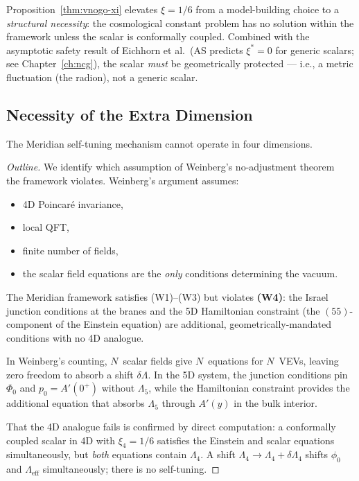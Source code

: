 \begin{remark}
Proposition~\ref{thm:vnogo-xi} elevates $\xi = 1/6$ from a model-building choice to a \emph{structural necessity}: the cosmological constant problem has no solution within the framework unless the scalar is conformally coupled. Combined with the asymptotic safety result of Eichhorn et al.\ (AS predicts $\xi^* = 0$ for generic scalars; see Chapter~\ref{ch:ncg}), the scalar \emph{must} be geometrically protected --- i.e., a metric fluctuation (the radion), not a generic scalar.
\end{remark}

\subsection{Necessity of the Extra Dimension}
\label{sec:3-vnogo-5d}

\begin{proposition}
\label{thm:vnogo-5d}
The Meridian self-tuning mechanism cannot operate in four dimensions.
\end{proposition}

\begin{proof}[Outline]
We identify which assumption of Weinberg's no-adjustment theorem~\cite{ch3:weinberg1989} the framework violates. Weinberg's argument assumes:
\begin{itemize}
  \item[(W1)] 4D Poincar\'e invariance,
  \item[(W2)] local QFT,
  \item[(W3)] finite number of fields,
  \item[(W4)] the scalar field equations are the \emph{only} conditions determining the vacuum.
\end{itemize}

The Meridian framework satisfies (W1)--(W3) but violates \textbf{(W4)}: the Israel junction conditions at the branes and the 5D Hamiltonian constraint (the $(55)$-component of the Einstein equation) are additional, geometrically-mandated conditions with no 4D analogue.

In Weinberg's counting, $N$~scalar fields give $N$~equations for $N$~VEVs, leaving zero freedom to absorb a shift $\delta\Lambda$. In the 5D system, the junction conditions pin $\Phi_0$ and $p_0 = A'(0^+)$ without $\Lambda_5$, while the Hamiltonian constraint provides the additional equation that absorbs $\Lambda_5$ through $A'(y)$ in the bulk interior.

That the 4D analogue fails is confirmed by direct computation: a conformally coupled scalar in 4D with $\xi_4 = 1/6$ satisfies the Einstein and scalar equations simultaneously, but \emph{both} equations contain $\Lambda_4$. A shift $\Lambda_4 \to \Lambda_4 + \delta\Lambda_4$ shifts $\phi_0$ and $\Lambda_{\mathrm{eff}}$ simultaneously; there is no self-tuning.
\end{proof}

